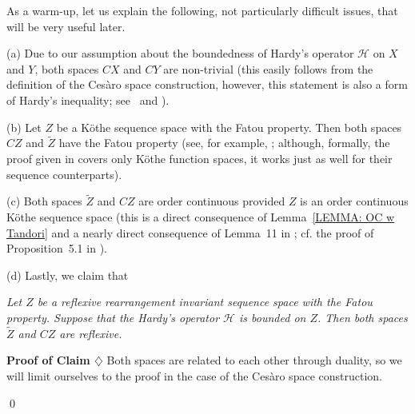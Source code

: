 \documentclass[11pt]{amsart}
\theoremstyle{definition}
\theoremstyle{definition}
\theoremstyle{definition}
\theoremstyle{definition}
\theoremstyle{definition}
\theoremstyle{definition}
\theoremstyle{definition}
\theoremstyle{definition}
\numberwithin{equation}{section}
\numberwithin{equation}{section}
\numberwithin{equation}{section}
\theoremstyle{definition}
\theoremstyle{definition}
\theoremstyle{definition}
\theoremstyle{definition}
\theoremstyle{definition}
\theoremstyle{definition}
\renewenvironment{proof}{\noindent {\bf Proof.}}{\qed}
\begin{document}
\begin{proof}
	As a warm-up, let us explain the following, not particularly difficult issues, that will be very useful later.

	(a) Due to our assumption about the boundedness of Hardy's operator $\mathscr{H}$ on $X$ and $Y$, both spaces $CX$ and $CY$ are non-trivial
	(this easily follows from the definition of the Ces{\` a}ro space construction, however, this statement is also a form of Hardy's inequality;
	see~\cite[p.~1]{Ben96} and \cite[pp.~19--21 and 147--159]{KMP07}).
			
	(b) Let $Z$ be a K{\" o}the sequence space with the Fatou property. Then both spaces $CZ$ and $\widetilde{Z}$ have the Fatou property
	(see, for example, \cite[Theorem~1(d)]{LM15a}; although, formally, the proof given in \cite{LM15a} covers only K{\" o}the function spaces,
	it works just as well for their sequence counterparts).
			
	(c) Both spaces $\widetilde{Z}$ and $CZ$ are order continuous provided $Z$ is an order continuous K{\" o}the sequence space
	(this is a direct consequence of Lemma~\ref{LEMMA: OC w Tandori} and a nearly direct consequence of Lemma~11 in \cite{KT17};
	cf. the proof of Proposition~5.1 in \cite{KKT22}).
			
	(d) Lastly, we claim that
		
	\vspace{5pt} 
	{\it Let $Z$ be a reflexive rearrangement invariant sequence space with the Fatou property.
		Suppose that the Hardy's operator $\mathscr{H}$ is bounded on $Z$.
		Then both spaces $\widetilde{Z}$ and $CZ$ are reflexive.}
	
	\vspace{5pt}
	\noindent
	{\bf Proof of Claim $\diamondsuit$}
		Both spaces are related to each other through duality, so we will limit ourselves to the proof in the case of the Ces{\` a}ro space construction.
		

\end{proof}
\end{document}
